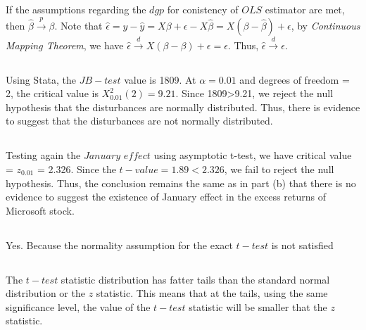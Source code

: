 \subsection{}
If the assumptions regarding the $dgp$  for conistency of $OLS$ estimator are met, then $\hat{\beta} \overset{p}{\rightarrow} \beta$. Note that $\hat{\epsilon} = y - \hat{y} =  X\beta + \epsilon - X\hat{\beta} = X(\beta - \hat{\beta}) + \epsilon$, by \textit{Continuous Mapping Theorem}, we have  $\hat{\epsilon} \overset{d}{\rightarrow} X(\beta - \beta) + \epsilon = \epsilon$. Thus, $\hat{\epsilon} \overset{d}{\rightarrow} \epsilon$.

\subsection{}

Using Stata, the $JB-test$ value is 1809. At $\alpha=0.01$ and degrees of freedom  = 2, the critical value is $X^2_{0.01}(2) = 9.21$. Since 1809>9.21, we reject the null hypothesis that the disturbances are normally distributed. Thus, there is evidence to suggest that the disturbances are not normally distributed.

\subsection{}
Testing again the $January$ $effect$ using asymptotic t-test, we have critical value =  $z_{0.01}$ = 2.326. Since the $t-value = 1.89 < 2.326$, we fail to reject the null hypothesis. Thus, the conclusion remains the same as in part (b) that there is no evidence to suggest the existence of January effect in the excess returns of Microsoft stock. 

\subsection{}
Yes. Because the normality assumption for the exact $t-test$ is not satisfied

\subsection{}
The $t-test$ statistic distribution has fatter tails than the standard normal distribution or the $z$ statistic. This means that at the tails, using the same significance level, the value of the $t-test$ statistic will be smaller that the $z$ statistic.